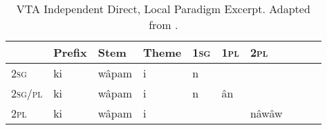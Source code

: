 \begin{table*}[h]
\centering
\begin{tabular}{llllllllll}
    \toprule
        & Prefix & Stem  & Theme & 1\textsc{sg} & 1\textsc{pl} & 2\textsc{pl} &  &  &  \\
    \midrule

2\textsc{sg}     & ki     & wâpam & i     & n  &     &       &  &  &  \\
2\textsc{sg/pl} & ki     & wâpam & i     & n & ân     &       &  &  &  \\
2\textsc{pl}     & ki     & wâpam & i     &    &     & nâwâw &  &  &  \\    
\bottomrule
  \end{tabular}
  \caption{
    VTA Independent Direct, Local Paradigm Excerpt. Adapted from \citet[418]{Wolvengrey2011}.\label{tab:vtadirlocal}
  }
\end{table*}

\begin{table*}
  \caption{
    VTA Independent Inverse, Mixed Participant Paradigm Excerpt. \citet[418]{Wolvengrey2011}. \label{tab:vtainv}
  }
\end{table*}


